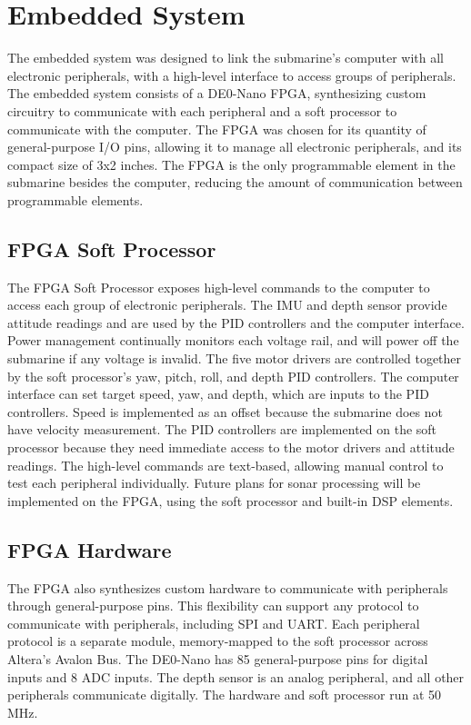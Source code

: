 \section{Embedded System}

The embedded system was designed to link the submarine's computer with all
electronic peripherals, with a high-level interface to access groups of peripherals.
The embedded system consists of a DE0-Nano FPGA, synthesizing custom circuitry to
communicate with each peripheral and a soft processor to communicate with the computer. The FPGA was chosen
for its quantity of general-purpose I/O pins, allowing it to manage all electronic peripherals,
and its compact size of 3x2 inches. The FPGA is the only programmable element in the submarine
besides the computer, reducing the amount of communication between programmable elements.

\subsection{FPGA Soft Processor}

The FPGA Soft Processor exposes high-level commands to the computer to access each group
of electronic peripherals.
The IMU and depth sensor provide attitude readings and are used by the PID controllers and the
computer interface. Power management continually monitors each
voltage rail, and will power off the submarine if any voltage is invalid.
The five motor drivers are controlled together by the soft processor's yaw, pitch, roll,
and depth PID controllers. The computer interface can set target
speed, yaw, and depth, which are inputs to the PID controllers. Speed is implemented as an offset
because the submarine does not have velocity measurement. The PID controllers are implemented on the
soft processor because they need immediate access to the motor drivers and attitude readings.
The high-level commands are
text-based, allowing manual control to test each peripheral individually.
Future plans for sonar processing will be implemented on the FPGA, using the soft processor and
built-in DSP elements.

\subsection{FPGA Hardware}

The FPGA also synthesizes custom hardware to communicate with peripherals through general-purpose pins.
This flexibility can support any protocol to communicate with peripherals, including SPI and UART.
Each peripheral protocol is a separate module, memory-mapped to the soft processor across Altera's
Avalon Bus. The DE0-Nano has 85 general-purpose pins for digital inputs and 8 ADC inputs.
The depth sensor is an analog peripheral, and all other peripherals communicate digitally.
The hardware and soft processor run at 50 MHz.

